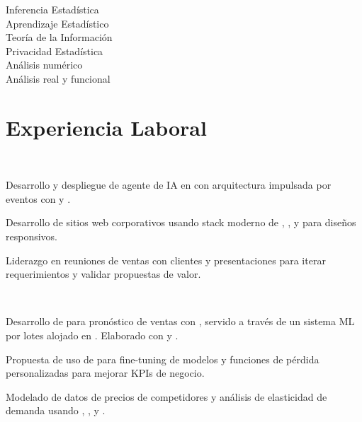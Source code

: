\documentclass[]{tex/deedy-resume-openfont}
\begin{document}
\begin{minipage}[t]{0.32\textwidth}
\sectionsep

Inferencia Estadística\\
Aprendizaje Estadístico\\
Teoría de la Información\\
Privacidad Estadística\\
Análisis numérico \\
Análisis real y funcional\\

%
%

\end{minipage} 
\hfill
\begin{minipage}[t]{0.67\textwidth} 


\section{Experiencia Laboral}

\\
\vspace{\topsep}
\begin{tightemize}
    \item Desarrollo y despliegue de agente de IA en  con arquitectura impulsada por eventos con  y .
    \item Desarrollo de sitios web corporativos usando stack moderno de , ,  y  para diseños responsivos.
    \item Liderazgo en reuniones de ventas con clientes y presentaciones para iterar requerimientos y validar propuestas de valor.
\end{tightemize}
\sectionsep

\\
\begin{tightemize}
    \item Desarrollo de  para pronóstico de ventas con , servido a través de un sistema ML por lotes alojado en . Elaborado con  y .
    \item Propuesta de uso de  para fine-tuning de modelos y funciones de pérdida personalizadas para mejorar KPIs de negocio.
    \item Modelado de datos de precios de competidores y análisis de elasticidad de demanda usando , ,  y .
\end{tightemize}
\sectionsep


\end{minipage}
\end{document}
